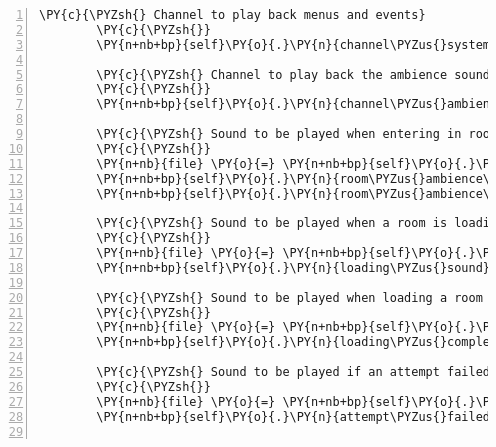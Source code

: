 \begin{Verbatim}[commandchars=\\\{\},numbers=left,firstnumber=1,stepnumber=1]
        \PY{c}{\PYZsh{} Channel to play back menus and events}
        \PY{c}{\PYZsh{}}
        \PY{n+nb+bp}{self}\PY{o}{.}\PY{n}{channel\PYZus{}system} \PY{o}{=} \PY{n}{pygame}\PY{o}{.}\PY{n}{mixer}\PY{o}{.}\PY{n}{Channel}\PY{p}{(}\PY{l+m+mi}{9}\PY{p}{)}

        \PY{c}{\PYZsh{} Channel to play back the ambience sounds of a room}
        \PY{c}{\PYZsh{}}
        \PY{n+nb+bp}{self}\PY{o}{.}\PY{n}{channel\PYZus{}ambience} \PY{o}{=} \PY{n}{pygame}\PY{o}{.}\PY{n}{mixer}\PY{o}{.}\PY{n}{Channel}\PY{p}{(}\PY{l+m+mi}{10}\PY{p}{)}

        \PY{c}{\PYZsh{} Sound to be played when entering in room input state}
        \PY{c}{\PYZsh{}}
        \PY{n+nb}{file} \PY{o}{=} \PY{n+nb+bp}{self}\PY{o}{.}\PY{n}{assets}\PY{o}{.}\PY{n}{fetch}\PY{p}{(}\PY{l+s}{\PYZsq{}}\PY{l+s}{ambience\PYZus{}room.ogg}\PY{l+s}{\PYZsq{}}\PY{p}{)}
        \PY{n+nb+bp}{self}\PY{o}{.}\PY{n}{room\PYZus{}ambience\PYZus{}sound} \PY{o}{=} \PY{n}{pygame}\PY{o}{.}\PY{n}{mixer}\PY{o}{.}\PY{n}{Sound}\PY{p}{(}\PY{n+nb}{file}\PY{p}{)}
        \PY{n+nb+bp}{self}\PY{o}{.}\PY{n}{room\PYZus{}ambience\PYZus{}sound}\PY{o}{.}\PY{n}{set\PYZus{}volume}\PY{p}{(}\PY{l+m+mf}{0.4}\PY{p}{)}

        \PY{c}{\PYZsh{} Sound to be played when a room is loading}
        \PY{c}{\PYZsh{}}
        \PY{n+nb}{file} \PY{o}{=} \PY{n+nb+bp}{self}\PY{o}{.}\PY{n}{assets}\PY{o}{.}\PY{n}{fetch}\PY{p}{(}\PY{l+s}{\PYZsq{}}\PY{l+s}{loading.ogg}\PY{l+s}{\PYZsq{}}\PY{p}{)}
        \PY{n+nb+bp}{self}\PY{o}{.}\PY{n}{loading\PYZus{}sound} \PY{o}{=} \PY{n}{pygame}\PY{o}{.}\PY{n}{mixer}\PY{o}{.}\PY{n}{Sound}\PY{p}{(}\PY{n+nb}{file}\PY{p}{)}

        \PY{c}{\PYZsh{} Sound to be played when loading a room is complete}
        \PY{c}{\PYZsh{}}
        \PY{n+nb}{file} \PY{o}{=} \PY{n+nb+bp}{self}\PY{o}{.}\PY{n}{assets}\PY{o}{.}\PY{n}{fetch}\PY{p}{(}\PY{l+s}{\PYZsq{}}\PY{l+s}{loading\PYZus{}complete.ogg}\PY{l+s}{\PYZsq{}}\PY{p}{)}
        \PY{n+nb+bp}{self}\PY{o}{.}\PY{n}{loading\PYZus{}complete\PYZus{}sound} \PY{o}{=} \PY{n}{pygame}\PY{o}{.}\PY{n}{mixer}\PY{o}{.}\PY{n}{Sound}\PY{p}{(}\PY{n+nb}{file}\PY{p}{)}

        \PY{c}{\PYZsh{} Sound to be played if an attempt failed event is sent by the server}
        \PY{c}{\PYZsh{}}
        \PY{n+nb}{file} \PY{o}{=} \PY{n+nb+bp}{self}\PY{o}{.}\PY{n}{assets}\PY{o}{.}\PY{n}{fetch}\PY{p}{(}\PY{l+s}{\PYZsq{}}\PY{l+s}{attempt\PYZus{}failed.ogg}\PY{l+s}{\PYZsq{}}\PY{p}{)}
        \PY{n+nb+bp}{self}\PY{o}{.}\PY{n}{attempt\PYZus{}failed\PYZus{}sound} \PY{o}{=} \PY{n}{pygame}\PY{o}{.}\PY{n}{mixer}\PY{o}{.}\PY{n}{Sound}\PY{p}{(}\PY{n+nb}{file}\PY{p}{)}


\end{Verbatim}
